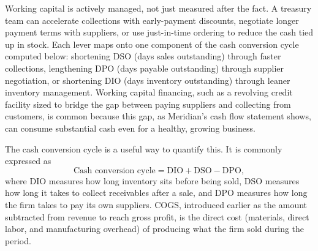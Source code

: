 \documentclass[../ai_in_finance]{subfiles}
\begin{document}
Working capital is actively managed, not just measured after the fact. A treasury team can accelerate collections with early-payment discounts, negotiate longer payment terms with suppliers, or use just-in-time ordering to reduce the cash tied up in stock. Each lever maps onto one component of the cash conversion cycle computed below:
shortening DSO (days sales outstanding) through faster collections, lengthening DPO (days payable outstanding) through supplier negotiation, or shortening DIO (days inventory outstanding) through leaner
 inventory management. Working capital financing, such as a revolving credit facility sized to bridge
the gap between paying suppliers and collecting from customers, is common because this gap, as Meridian's
cash flow statement shows, can consume substantial cash even for a healthy, growing business.

The cash conversion cycle is a useful way to quantify this. It is commonly expressed as
\begin{equation}
\text{Cash conversion cycle} = \text{DIO} + \text{DSO} - \text{DPO},\label{eq:statements-ccc}
\end{equation}
where DIO  measures how long inventory sits before being sold, DSO  measures how long it takes to collect receivables after a sale,
and DPO  measures how long the firm takes to pay its own suppliers. COGS, introduced earlier as the amount subtracted from revenue to reach gross profit, is the direct cost (materials, direct labor, and manufacturing overhead) of producing what the firm sold during the period.
\end{document}
